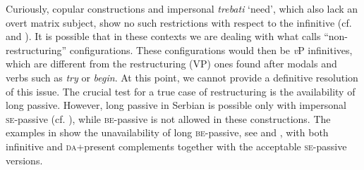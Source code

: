 \documentclass[output=paper,modfonts,newtxmath,hidelinks,]{langscibook}
\begin{document}
\ea \label{7:ex15}
	\z
\z

\noindent Curiously, copular constructions and impersonal \textit{trebati} `need', which also lack an overt matrix subject, show no such restrictions with respect to the infinitive (cf.  and ). It is possible that in these contexts we are dealing with what \citet{Wurmbrand2003} calls “non-restructuring” configurations. These configurations would then be \textit{v}P infinitives, which are different from the restructuring (VP) ones found after modals and verbs such as \textit{try} or \textit{begin}. At this point, we cannot provide a definitive resolution of this issue. The crucial test for a true case of restructuring is the availability of long passive. However, long passive in Serbian is possible only with impersonal \textsc{se}-passive (cf. \citealt{TodorovicWurmbrand2015}), while \textsc{be}-passive is not allowed in these constructions. The examples in  show the unavailability of long \textsc{be-}passive, see  and , with both infinitive and \textsc{da}+present complements together with the acceptable \textsc{se-}passive versions.
\end{document}
